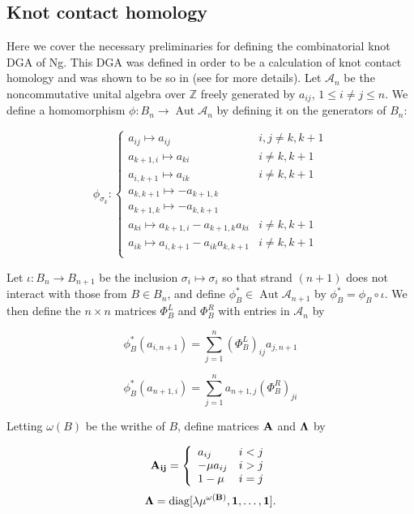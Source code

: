 \documentclass[11pt]{amsart}
\def\Z{{\mathbb Z}}
\def\A{{\mathcal A}}
\def\s{{\sigma}}
\newcommand\Aut{\operatorname{Aut}}
\newcommand\diag{\operatorname{diag}}
\begin{document}
\subsection{Knot contact homology}
\label{SecBG_KCHdef}

  Here we cover the necessary preliminaries for defining the combinatorial knot DGA of Ng. This DGA was defined in order to be a calculation of knot contact homology and was shown to be so in \cite{EENS12} (see \cite{Ng12} for more details). Let $\A_n$ be the noncommutative unital algebra over $\Z$ freely generated by $a_{ij}$, $1\le i\ne j\le n$.  We define a homomorphism $\phi : B_n \rightarrow\Aut \A_n$ by defining it on the generators of $B_n$:

  \begin{equation}
  \phi_{\s_k}\colon
  \left\{
       \begin{array}{lr}
         a_{ij}\mapsto a_{ij} & i,j\ne k,k+1\\
         a_{k+1,i}\mapsto a_{ki} & i\ne k,k+1\\
         a_{i,k+1}\mapsto a_{ik} & i\ne k,k+1\\
         a_{k,k+1}\mapsto -a_{k+1,k} & \\
         a_{k+1,k}\mapsto -a_{k,k+1} & \\
         a_{ki}\mapsto a_{k+1,i} - a_{k+1,k}a_{ki} & i\ne k,k+1\\
         a_{ik}\mapsto a_{i,k+1} - a_{ik}a_{k,k+1} & i\ne k,k+1\\
       \end{array}
  \right.
  \label{DefnPhiMap}
  \end{equation}

  Let $\iota\colon B_n \rightarrow B_{n+1}$ be the inclusion $\s_i\mapsto\s_i$ so that strand $(n+1)$ does not interact with those from $B\in B_n$, and define $\phi_B^*\in \Aut \A_{n+1}$ by $\phi_B^* = \phi_B\circ\iota$.  We then define the $n\times n$ matrices $\Phi_B^L$ and $\Phi_B^R$ with entries in $\A_n$ by

  $$\phi_B^*(a_{i,n+1}) = \sum_{j=1}^n(\Phi_B^L)_{ij}a_{j,n+1}$$

  $$\phi_B^*(a_{n+1,i}) = \sum_{j=1}^na_{n+1,j}(\Phi_B^R)_{ji}$$

  Letting $\omega(B)$ be the writhe of $B$, define matrices $\bf{A}$ and $\bf{\Lambda}$ by

  \begin{equation}
  \bf{A}_{ij} = 
  \left\{
       \begin{array}{lr}
        a_{ij} & i<j\\
        -\mu a_{ij} & i>j\\
        1-\mu & i = j\\
       \end{array}
  \right.
  \label{def:Amatrix}
  \end{equation}
  \begin{equation}
  \bf{\Lambda} = \diag[\lambda\mu^{\omega(B)},1,\ldots,1].
  \label{defn:Lambda}
  \end{equation}
\end{document}
